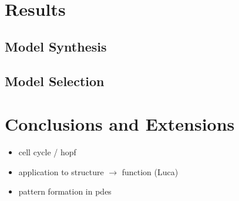 \section{Results}

\subsection{Model Synthesis}


\subsection{Model Selection}



\section{Conclusions and Extensions}
\label{sec:conclusions}

\begin{itemize}
    \item cell cycle / hopf
    \item application to structure $\rightarrow$ function (Luca)
    \item pattern formation in pdes
\end{itemize}




